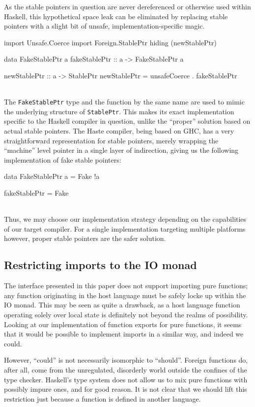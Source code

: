 \documentclass[preprint]{sigplanconf}
\begin{document}
As the stable pointers in question are never dereferenced or otherwise
used within Haskell, this hypothetical space leak can be eliminated by
replacing stable pointers with a slight bit of unsafe, implementation-specific
magic.\\
\begin{code}
  import Unsafe.Coerce
  import Foreign.StablePtr hiding (newStablePtr)

  data FakeStablePtr a
  fakeStablePtr :: a -> FakeStablePtr a

  newStablePtr :: a -> StablePtr
  newStablePtr = unsafeCoerce . fakeStablePtr
\end{code}\\
The \lstinline!FakeStablePtr! type and the function by the same name are used
to mimic the underlying structure of \lstinline!StablePtr!. This makes its
exact implementation specific to the Haskell compiler in question, unlike
the ``proper'' solution based on actual stable pointers. The Haste
compiler, being based on GHC, has a very straightforward representation for
stable pointers, merely wrapping the ``machine'' level pointer in a single
layer of indirection, giving us the following implementation of fake stable
pointers:\\
\begin{code}
  data FakeStablePtr a = Fake !a

  fakeStablePtr = Fake
\end{code}\\
Thus, we may choose our implementation strategy depending on the capabilities
of our target compiler. For a single implementation targeting multiple
platforms however, proper stable pointers are the safer solution.

\subsection{Restricting imports to the IO monad}
The interface presented in this paper does not support importing pure
functions; any function originating in the host language must be safely locke
up within the IO monad. This may be seen as quite a drawback, as a host
language function operating solely over local state is definitely not
beyond the realms of possibility. Looking at our implementation of function
exports for pure functions, it seems that it would be possible to implement
imports in a similar way, and indeed we could.

However, ``could'' is not necessarily isomorphic to ``should''.
Foreign functions do, after all, come from the unregulated, disorderly world
outside the confines of the type checker. Haskell's type system does not
allow us to mix pure functions with possibly impure ones, and for good
reason. It is not clear that we should lift this
restriction just because a function is defined in another language.
\end{document}
